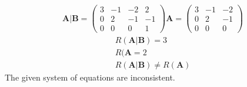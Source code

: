 \documentclass[journal,13pt,twocolumn]{IEEEtran}
\newcommand{\myvec}[1]{\ensuremath{\begin{pmatrix}#1\end{pmatrix}}}
\renewcommand{\vec}[1]{\mathbf{#1}}
\begin{document}
\begin{align}
\vec{A}|\vec{B}=\left(\begin{array}{ccc|c}  
 3 & -1 & -2 & 2\\  
 0 & 2 & -1 & -1\\
 0 & 0 & 0 & 1
\end{array}\right) 
\vec{A}=\myvec
 {3 & -1 & -2\\  
 0 & 2 & -1\\
 0 & 0 & 0}
\end{align}
\begin{align}
R(\vec{A}|\vec{B}) = 3\\
R(\vec{A} = 2\\
R(\vec{A}|\vec{B}) \neq  R(\vec{A})
\end{align}
The given system of equations are inconsistent.
\end{document}
